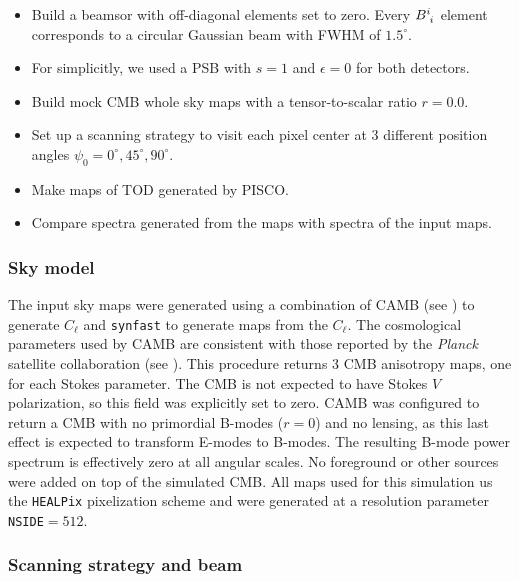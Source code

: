 \documentclass[a4paper,11pt]{article}
\begin{document}
\begin{itemize}
    \item Build a beamsor with off-diagonal elements set to zero. Every $\tensor{B}{^i_i}$ element corresponds to a circular Gaussian beam with FWHM of $1.5^\circ$. 
    \item For simplicitly, we used a PSB with $s=1$ and $\epsilon=0$ for both detectors.
    \item Build mock CMB whole sky maps with a tensor-to-scalar ratio $r=0.0$.
	\item Set up a scanning strategy to visit each pixel center at 3 different position angles $\psi_0 = 0^{\circ},45^{\circ},90^{\circ}$. 
	\item Make maps of TOD generated by PISCO. 
	\item Compare spectra generated from the maps with spectra of the input maps.
\end{itemize}

\subsubsection{Sky model}
\label{subsec::sky_model}

The input sky maps were generated using a combination of CAMB (see \cite{Lewis:2002ah}) to generate $C_\ell$ and \texttt{synfast} to generate maps from the $C_\ell$. The cosmological parameters used by CAMB are consistent with those reported by the \textsl{Planck} satellite collaboration (see \cite{2016A&A...594A..13P}). This procedure returns 3 CMB anisotropy maps, one for each Stokes parameter. The CMB is not expected to have Stokes $V$ polarization, so this field was explicitly set to zero. CAMB was configured to return a CMB with no primordial B-modes ($r=0$) and no lensing, as this last effect is expected to transform E-modes to B-modes. The resulting B-mode power spectrum is effectively zero at all angular scales. No foreground or other sources were added on top of the simulated CMB. All maps used for this simulation us the \texttt{HEALPix} pixelization scheme and were generated at a resolution parameter \texttt{NSIDE}$=512$.

\subsubsection{Scanning strategy and beam}
\end{document}
